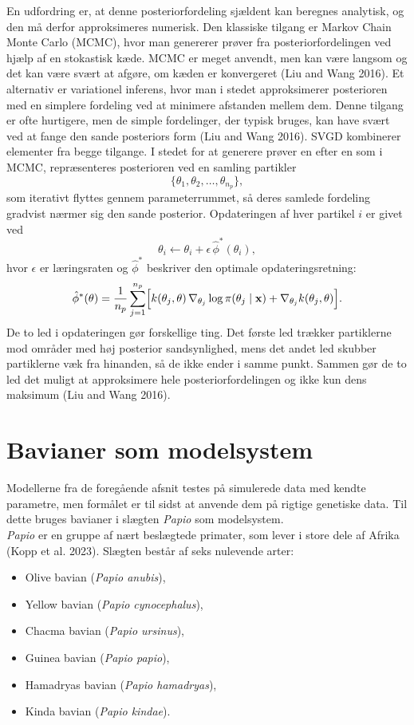 \documentclass[
  10pt,
  a4paper,
]{scrbook}
\providecommand{\tightlist}{%
  \setlength{\itemsep}{0pt}\setlength{\parskip}{0pt}}
\let\oldemph\emph
\renewcommand\emph[1]{\oldemph{\color{gray}#1}}
\begin{document}
En udfordring er, at denne posteriorfordeling sjældent kan beregnes
analytisk, og den må derfor approksimeres numerisk. Den klassiske
tilgang er Markov Chain Monte Carlo (MCMC), hvor man genererer prøver
fra posteriorfordelingen ved hjælp af en stokastisk kæde. MCMC er meget
anvendt, men kan være langsom og det kan være svært at afgøre, om kæden
er konvergeret (Liu and Wang 2016). Et alternativ er variationel
inferens, hvor man i stedet approksimerer posterioren med en simplere
fordeling ved at minimere afstanden mellem dem. Denne tilgang er ofte
hurtigere, men de simple fordelinger, der typisk bruges, kan have svært
ved at fange den sande posteriors form (Liu and Wang 2016). SVGD
kombinerer elementer fra begge tilgange. I stedet for at generere prøver
en efter en som i MCMC, repræsenteres posterioren ved en samling
partikler \[
\{\theta_1,\theta_2,\ldots,\theta_{n_p}\},
\] som iterativt flyttes gennem parameterrummet, så deres samlede
fordeling gradvist nærmer sig den sande posterior. Opdateringen af hver
partikel \(i\) er givet ved \[
\theta_i \leftarrow \theta_i + \epsilon\, \hat{\phi}^*(\theta_i),
\] hvor \(\epsilon\) er læringsraten og \(\hat{\phi}^*\) beskriver den
optimale opdateringsretning: \[
\hat{\phi}^*(\theta) = \frac{1}{n_p}\sum_{j=1}^{n_p}\Bigl[k(\theta_j, \theta)\,\nabla_{\theta_j}\log\pi(\theta_j\mid\mathbf{x}) + \nabla_{\theta_j}k(\theta_j, \theta)\Bigr].
\] De to led i opdateringen gør forskellige ting. Det første led trækker
partiklerne mod områder med høj posterior sandsynlighed, mens det andet
led skubber partiklerne væk fra hinanden, så de ikke ender i samme
punkt. Sammen gør de to led det muligt at approksimere hele
posteriorfordelingen og ikke kun dens maksimum (Liu and Wang 2016).

\section{Bavianer som modelsystem}\label{bavianer-som-modelsystem}

Modellerne fra de foregående afsnit testes på simulerede data med kendte
parametre, men formålet er til sidst at anvende dem på rigtige genetiske
data. Til dette bruges bavianer i slægten \emph{Papio} som
modelsystem.\\
\emph{Papio} er en gruppe af nært beslægtede primater, som lever i store
dele af Afrika (Kopp et al. 2023). Slægten består af seks nulevende
arter:

\begin{itemize}
\tightlist
\item
  Olive bavian (\emph{Papio anubis}),
\item
  Yellow bavian (\emph{Papio cynocephalus}),
\item
  Chacma bavian (\emph{Papio ursinus}),
\item
  Guinea bavian (\emph{Papio papio}),
\item
  Hamadryas bavian (\emph{Papio hamadryas}),
\item
  Kinda bavian (\emph{Papio kindae}).
\end{itemize}
\end{document}
